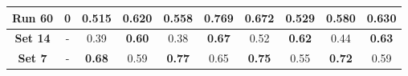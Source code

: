 \begin{table}[!ht]
\begin{tabular}{|c|c|cc|cc|cc|cc|}
		\textbf{Run 60} & 0 & \textbf{0.515} & 0.620 & \textbf{0.558} & \textbf{0.769} & 0.672 & 0.529 & \textbf{0.580} & 0.630 \\
		
		\hline
		
		\textbf{Set 14} & - & 0.39 & \textbf{0.60} & 0.38 & \textbf{0.67} & 0.52 & \textbf{0.62} & 0.44 & \textbf{0.63} \\
		
		\hline
		\hline
		
		\textbf{Set 7} & - & \textbf{0.68} & 0.59 & \textbf{0.77} & 0.65 & \textbf{0.75} & 0.55 & \textbf{0.72} & 0.59 \\
		
		\hline
		
	\end{tabular}
	\label{tab:Experiment2PED}
\end{table}


